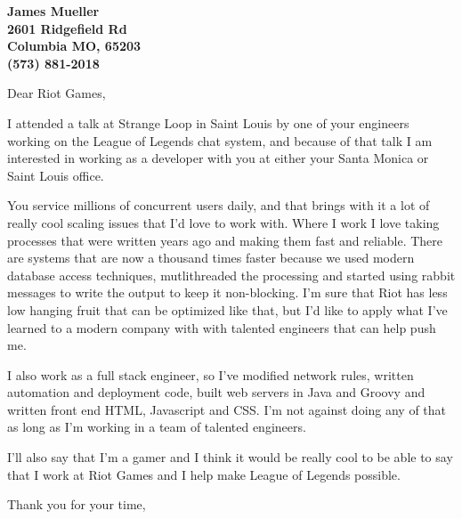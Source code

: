 \documentclass[11pt]{letter} %
\begin{document}

\begin{letter}{} 


\begin{center}
\large\bf James Mueller \\ %
2601 Ridgefield Rd \\ Columbia MO, 65203 \\ (573) 881-2018 %
\end{center} 
\vfill

\signature{James Mueller} %


\opening{Dear Riot Games,} 

I attended a talk at Strange Loop in Saint Louis by one of your engineers working on the League of Legends chat system, and because of that talk I am interested in working as a developer with you at either your Santa Monica or Saint Louis office. 

You service millions of concurrent users daily, and that brings with it a lot of really cool scaling issues that I'd love to work with. Where I work I love taking processes that were written years ago and making them fast and reliable. There are systems that are now a thousand times faster because we used modern database access techniques, mutlithreaded the processing and started using rabbit messages to write the output to keep it non-blocking. I'm sure that Riot has less low hanging fruit that can be optimized like that, but I'd like to apply what I've learned to a modern company with with talented engineers that can help push me. 

I also work as a full stack engineer, so I've modified network rules, written automation and deployment code, built web servers in Java and Groovy and written front end HTML, Javascript and CSS. I'm not against doing any of that as long as I'm working in a team of talented engineers.
 
I'll also say that I'm a gamer and I think it would be really cool to be able to say that I work at Riot Games and I help make League of Legends possible.

\closing{Thank you for your time,}




\end{letter}
\end{document}
